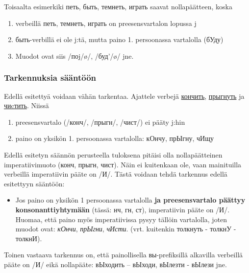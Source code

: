 \documentclass[]{scrartcl}
\providecommand{\tightlist}{%
  \setlength{\itemsep}{0pt}\setlength{\parskip}{0pt}}
\begin{document}
Toisaalta esimerkiki петь, быть, темнеть, играть saavat nollapäätteen,
koska

\begin{enumerate}
\def\labelenumi{\arabic{enumi}.}
\tightlist
\item
  verbeillä петь, темнеть, играть on preesensvartalon lopussa j
\item
  быть-verbillä ei ole j:tä, mutta paino 1. persoonassa vartalolla
  (бУду)
\item
  Muodot ovat siis /поj/ø/, /буд'/ø/ jne.
\end{enumerate}

\subsubsection{Tarkennuksia
sääntöön}\label{tarkennuksia-suxe4uxe4ntuxf6uxf6n}

Edellä esitettyä voidaan vähän tarkentaa. Ajattele verbejä
\href{http://ru.wiktionary.org/wiki/кончить}{кончить},
\href{http://ru.wiktionary.org/wiki/прыгнуть}{прыгнуть} ja
\href{http://ru.wiktionary.org/wiki/чиcтить}{чиcтить}. Niissä

\begin{enumerate}
\def\labelenumi{\arabic{enumi}.}
\tightlist
\item
  preesensvartalo (/конч/, /прыгн/, /чист/) ei pääty j:hin
\item
  paino on yksikön 1. persoonassa vartalolla: кОнчу, прЫгну, чИщу
\end{enumerate}

Edellä esitetyn säännön perusteella tuloksena pitäisi olla
nollapäätteinen imperatiivimuoto (конч, прыгн, чист). Näin ei kuitenkaan
ole, vaan mainituilla verbeillä imperatiivin pääte on /И/. Tästä voidaan
tehdä tarkennus edellä esitettyyn sääntöön:

\begin{itemize}
\tightlist
\item
  Jos paino on yksikön 1 persoonassa vartalolla \textbf{ja
  preesensvartalo päättyy konsonanttiyhtymään} (tässä: нч, гн, ст),
  imperatiivin pääte on /И/. Huomaa, että paino myös imperatiivissa
  pysyy tällöin vartalolla, joten muodot ovat: \emph{кОнчи},
  \emph{прЫгни}, \emph{чИсти}. (vrt. kuitenkin толкнуть - толкнУ -
  толкнИ).
\end{itemize}

Toinen vastaava tarkennus on, että painollisella вы-prefiksillä
alkavilla verbeillä pääte on /И/ eikä nollapääte: вЫходить -- вЫходи,
вЫлезти - вЫлези jne.
\end{document}
